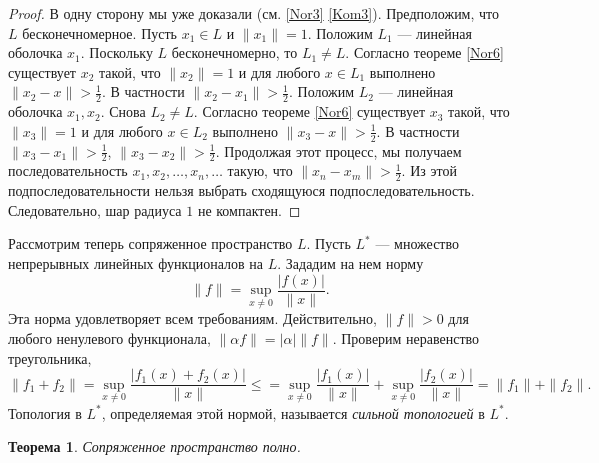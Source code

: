 \documentclass[12pt, titlepage, oneside]{amsbook}
\newtheorem{theorem}{Теорема}[chapter]
\theoremstyle{definition}
\theoremstyle{remark}
\begin{document}
\begin{proof}
В одну сторону мы уже доказали (см. \ref{Nor3} \ref{Kom3}). Предположим, что $L$ бесконечномерное. Пусть $x_1\in L$ и $\|x_1\|=1$. Положим $L_1$ --- линейная оболочка $x_1$. Поскольку $L$ бесконечномерно, то $L_1\neq L$. Согласно теореме \ref{Nor6} существует $x_2$ такой, что $\|x_2\|=1$ и для любого $x\in L_1$ выполнено $\|x_2-x\|>\frac{1}{2}$. В частности $\|x_2-x_1\|>\frac{1}{2}$. Положим $L_2$ --- линейная оболочка $x_1,x_2$. Снова $L_2\neq L$. Согласно теореме \ref{Nor6} существует $x_3$ такой, что $\|x_3\|=1$ и для любого $x\in L_2$ выполнено $\|x_3-x\|>\frac{1}{2}$. В частности $\|x_3-x_1\|>\frac{1}{2}$, $\|x_3-x_2\|>\frac{1}{2}$. Продолжая этот процесс, мы получаем последовательность $x_1,x_2,\ldots, x_n,\ldots$ такую, что $\|x_n-x_m\|>\frac{1}{2}$. Из этой подпоследовательности нельзя выбрать сходящуюся подпоследовательность. Следовательно, шар радиуса $1$ не компактен.
\end{proof}

Рассмотрим теперь сопряженное пространство $L$. Пусть $L^*$ --- множество непрерывных линейных функционалов на $L$. Зададим на нем норму $$\|f\|=\sup\limits_{x\neq 0}\frac{|f(x)|}{\|x\|}.$$ Эта норма удовлетворяет всем требованиям. Действительно, $\|f\|>0$ для любого ненулевого функционала, $\|\alpha f\|=|\alpha| \|f\|$. Проверим неравенство треугольника, $$\|f_1+f_2\|=\sup\limits_{x\neq 0}\frac{|f_1(x)+f_2(x)|}{\|x\|}\leq=\sup\limits_{x\neq 0}\frac{|f_1(x)|}{\|x\|}+\sup\limits_{x\neq 0}\frac{|f_2(x)|}{\|x\|}=\|f_1\|+\|f_2\|.$$ Топология в $L^*$, определяемая этой нормой, называется \emph{сильной топологией} в $L^*$.

\begin{theorem}
\label{Nor8}
Сопряженное пространство полно.
\end{theorem}
\end{document}
